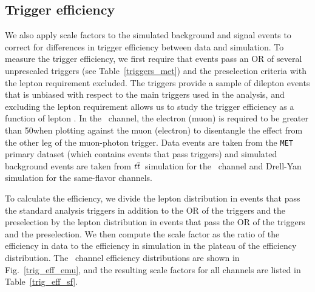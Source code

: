 \subsection{Trigger efficiency}
\label{trig_eff}
We also apply scale factors to the simulated background and signal events to correct for differences in trigger efficiency between data and simulation. To measure the trigger efficiency, we first require that events pass an OR of several unprescaled \ptmiss triggers (see Table~\ref{triggers_met}) and the preselection criteria with the lepton \pt requirement excluded. The \ptmiss triggers provide a sample of dilepton events that is unbiased with respect to the main triggers used in the analysis, and excluding the lepton \pt requirement allows us to study the trigger efficiency as a function of lepton \pt. In the \Pe\Pgm\ channel, the electron (muon) \pt is required to be greater than 50\GeV when plotting against the muon (electron) \pt to disentangle the effect from the other leg of the muon-photon trigger. Data events are taken from the \texttt{MET} primary dataset (which contains events that pass \ptmiss triggers) and simulated background events are taken from $t\overline{t}$\ simulation for the \Pe\Pgm\ channel and Drell-Yan simulation for the same-flavor channels.



To calculate the efficiency, we divide the lepton \pt distribution in events that pass the standard analysis triggers in addition to the OR of the \ptmiss triggers and the preselection by the lepton \pt distribution in events that pass the OR of the \ptmiss triggers and the preselection. We then compute the scale factor as the ratio of the efficiency in data to the efficiency in simulation in the plateau of the efficiency distribution. The \Pe\Pgm\ channel efficiency distributions are shown in Fig.~\ref{trig_eff_emu}, and the resulting scale factors for all channels are listed in Table~\ref{trig_eff_sf}.




\pagebreak